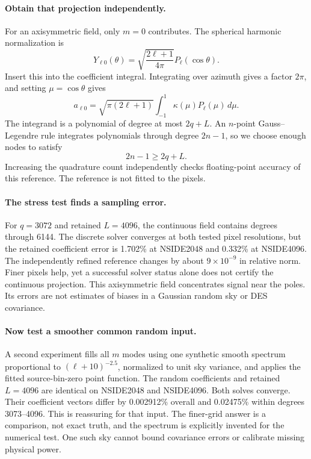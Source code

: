 \documentclass[11pt]{article}
\begin{document}
\paragraph{Obtain that projection independently.}
For an axisymmetric field, only $m=0$ contributes. The spherical harmonic
normalization is
\begin{equation}
 Y_{\ell0}(\theta)=\sqrt{\frac{2\ell+1}{4\pi}}P_\ell(\cos\theta).
\end{equation}
Insert this into the coefficient integral. Integrating over azimuth gives
a factor $2\pi$, and setting $\mu=\cos\theta$ gives
\begin{equation}
 a_{\ell0}=\sqrt{\pi(2\ell+1)}
 \int_{-1}^{1}\kappa(\mu)P_\ell(\mu)\,d\mu.
\end{equation}
The integrand is a polynomial of degree at most $2q+L$. An $n$-point
Gauss--Legendre rule integrates polynomials through degree $2n-1$, so we
choose enough nodes to satisfy
\begin{equation}
 2n-1\geq2q+L.
\end{equation}
Increasing the quadrature count independently checks floating-point
accuracy of this reference. The reference is not fitted to the pixels.

\paragraph{The stress test finds a sampling error.}
For $q=3072$ and retained $L=4096$, the continuous field contains degrees
through 6144. The discrete solver converges at both tested pixel
resolutions, but the retained coefficient error is 1.702\% at NSIDE2048
and 0.332\% at NSIDE4096. The independently refined reference changes by
about $9\times10^{-9}$ in relative norm. Finer pixels help, yet a successful
solver status alone does not certify the continuous projection. This
axisymmetric field concentrates signal near the poles. Its errors are
not estimates of biases in a Gaussian random sky or DES covariance.

\paragraph{Now test a smoother common random input.}
A second experiment fills all $m$ modes using one synthetic smooth spectrum
proportional to $(\ell+10)^{-2.5}$, normalized to unit sky variance, and
applies the fitted source-bin-zero point function. The random coefficients
and retained $L=4096$ are identical on NSIDE2048 and NSIDE4096. Both solves
converge. Their coefficient vectors differ by 0.002912\% overall and
0.02475\% within degrees 3073--4096. This is reassuring for that input.
The finer-grid answer is a comparison, not exact truth, and the spectrum
is explicitly invented for the numerical test. One such sky cannot bound
covariance errors or calibrate missing physical power.
\end{document}
